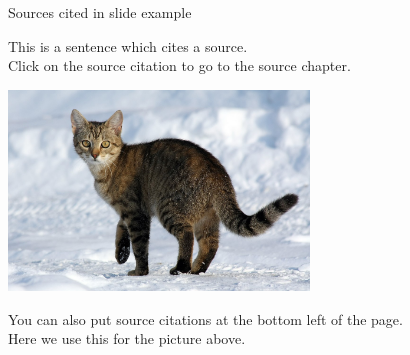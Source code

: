 \begin{frame}{Sources cited in slide example}

  This is a sentence which cites a source. \cite{Ahlswede2000-1} \\
  Click on the source citation to go to the source chapter.

  \vspace{0.3cm}

  \includegraphics[width=0.6\textwidth]{images/cat-2.jpg}
  
  \vspace{0.3cm}
  
  You can also put source citations at the bottom left of the page. \\
  Here we use this for the picture above.

		
\end{frame}

